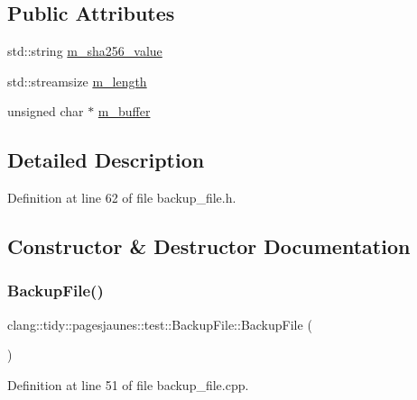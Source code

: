 \subsection*{Public Attributes}
\begin{DoxyCompactItemize}
\item 
std\+::string \hyperlink{classclang_1_1tidy_1_1pagesjaunes_1_1test_1_1_backup_file_afa28a0ba37bd55cda92f97904057a905}{m\+\_\+sha256\+\_\+value}
\item 
std\+::streamsize \hyperlink{classclang_1_1tidy_1_1pagesjaunes_1_1test_1_1_backup_file_a1be4aaaffaf4be578d521a1af395535e}{m\+\_\+length}
\item 
unsigned char $\ast$ \hyperlink{classclang_1_1tidy_1_1pagesjaunes_1_1test_1_1_backup_file_acddd3609ad623f6e5e122e31125509a6}{m\+\_\+buffer}
\end{DoxyCompactItemize}


\subsection{Detailed Description}


Definition at line 62 of file backup\+\_\+file.\+h.



\subsection{Constructor \& Destructor Documentation}
\mbox{\label{classclang_1_1tidy_1_1pagesjaunes_1_1test_1_1_backup_file_a1f42e8a56c0802a2e04f6a93471aa073}} 
\subsubsection{\texorpdfstring{Backup\+File()}{BackupFile()}}
{\footnotesize\ttfamily clang\+::tidy\+::pagesjaunes\+::test\+::\+Backup\+File\+::\+Backup\+File (\begin{DoxyParamCaption}{ }\end{DoxyParamCaption})}



Definition at line 51 of file backup\+\_\+file.\+cpp.

